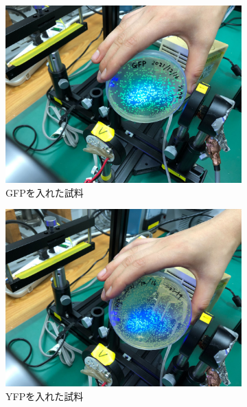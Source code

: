 \documentclass[a4paper,11pt, titlepage]{jsarticle}
\begin{document}
\begin{figure}[htbp]
    \centering
    \begin{subfigure}{0.3\columnwidth}
        \centering
        \includegraphics[width=\columnwidth]{gfp.jpg}
        \caption{GFPを入れた試料}
        \label{fig:gfp_picture}
    \end{subfigure}
    \begin{subfigure}{0.3\columnwidth}
        \centering
        \includegraphics[width=\columnwidth]{yfp.jpg}
        \caption{YFPを入れた試料}
        \label{fig:yfp_picture}
    \end{subfigure}
    \begin{subfigure}{0.3\columnwidth}
        \centering

\end{subfigure}
\end{figure}
\end{document}
